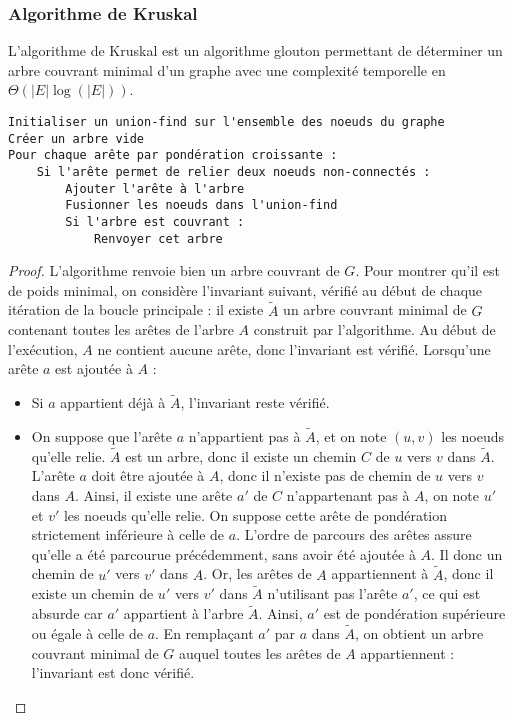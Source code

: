 \documentclass[11pt,a4paper]{article}
\begin{document}
    \subsubsection{Algorithme de Kruskal}
L'algorithme de Kruskal est un algorithme glouton permettant de déterminer un arbre couvrant minimal d'un graphe avec une complexité temporelle en \(\Theta\left(|E|\log(|E|)\right)\).
\begin{lstlisting}
Initialiser un union-find sur l'ensemble des noeuds du graphe
Créer un arbre vide
Pour chaque arête par pondération croissante :
    Si l'arête permet de relier deux noeuds non-connectés :
        Ajouter l'arête à l'arbre
        Fusionner les noeuds dans l'union-find
        Si l'arbre est couvrant :
            Renvoyer cet arbre
\end{lstlisting}

\begin{proof}
  L'algorithme renvoie bien un arbre couvrant de \(G\). Pour montrer qu'il est de poids minimal, on considère l'invariant suivant, vérifié au début de chaque itération de la boucle principale : il existe \(\widetilde{A}\) un arbre couvrant minimal de \(G\) contenant toutes les arêtes de l'arbre \(A\) construit par l'algorithme. Au début de l'exécution, \(A\) ne contient aucune arête, donc l'invariant est vérifié. Lorsqu'une arête \(a\) est ajoutée à \(A\) :
  \begin{itemize}
    \item Si \(a\) appartient déjà à \(\widetilde{A}\), l'invariant reste vérifié.
    \item On suppose que l'arête \(a\) n'appartient pas à \(\widetilde{A}\), et on note \((u,v)\) les noeuds qu'elle relie. \(\widetilde{A}\) est un arbre, donc il existe un chemin \(C\) de \(u\) vers \(v\) dans \(\widetilde{A}\). L'arête \(a\) doit être ajoutée à \(A\), donc il n'existe pas de chemin de \(u\) vers \(v\) dans \(A\). Ainsi, il existe une arête \(a'\) de \(C\) n'appartenant pas à \(A\), on note \(u'\) et \(v'\) les noeuds qu'elle relie. On suppose cette arête de pondération strictement inférieure à celle de \(a\). L'ordre de parcours des arêtes assure qu'elle a été parcourue précédemment, sans avoir été ajoutée à \(A\). Il donc un chemin de \(u'\) vers \(v'\) dans \(A\). Or, les arêtes de \(A\) appartiennent à \(\widetilde{A}\), donc il existe un chemin de \(u'\) vers \(v'\) dans \(\widetilde{A}\) n'utilisant pas l'arête \(a'\), ce qui est absurde car \(a'\) appartient à l'arbre \(\widetilde{A}\). Ainsi, \(a'\) est de pondération supérieure ou égale à celle de \(a\). En remplaçant \(a'\) par \(a\) dans \(\widetilde{A}\), on obtient un arbre couvrant minimal de \(G\) auquel toutes les arêtes de \(A\) appartiennent : l'invariant est donc vérifié.
  \end{itemize}
\end{proof}
\end{document}
